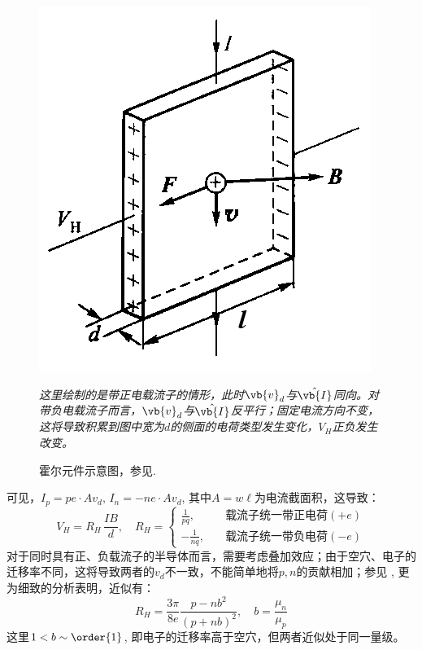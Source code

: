 \documentclass[aps,pre,12pt,preprint,%
	onecolumn,showpacs,showkeys,nofootinbib]{revtex4-1}
\begin{document}
	\begin{figure}[!h]
	\vspace{.8ex}
	\includegraphics[width=.45\linewidth]{HallApp.jpg}
	\caption[霍尔元件示意图]{霍尔元件示意图，参见\cite{textbook}.}
	\vspace{1ex}
	\raggedright\small
	\textit{\hphantom{说明}
		这里绘制的是带正电载流子的情形，此时$\vb{v}_d$与$\hat{\vb{I}}$同向。对带负电载流子而言，$\vb{v}_d$与$\hat{\vb{I}}$反平行；固定电流方向不变，这将导致积累到图中宽为$d$的侧面的电荷类型发生变化，$V_H$正负发生改变。
	\vspace{1ex}}
	\label{fig:HallApp}
	\end{figure}
	
	可见，$I_p = pe\cdot Av_d,\,I_n = -ne\cdot Av_d$, 其中$A = w\ell$为电流截面积，这导致：
	\begin{equation}
		V_H = R_H\,\frac{IB}{d},\quad
		R_H =
		\left\lbrace
		\begin{aligned}
			\frac{1}{pq},\quad
				&\textit{载流子统一带正电荷$(+e)$}\\[1ex]
			-\frac{1}{nq},\quad
				&\textit{载流子统一带负电荷$(-e)$}
		\end{aligned}
		\right.
	\end{equation}
	对于同时具有正、负载流子的半导体而言，需要考虑叠加效应；由于空穴、电子的迁移率不同，这将导致两者的$v_d$不一致，不能简单地将$p,n$的贡献相加；参见 \cite{kasap2001hall}, 更为细致的分析表明，近似有：
	\begin{equation}
		R_H = \frac{3\pi}{8e} \frac{p-nb^2}{(p+nb)^2},\quad
		b = \frac{\mu_n}{\mu_p}
		\label{eq:hallRh}
	\end{equation}
	这里$1 < b \sim \order{1}$, 即电子的迁移率高于空穴，但两者近似处于同一量级。
	
\end{document}
